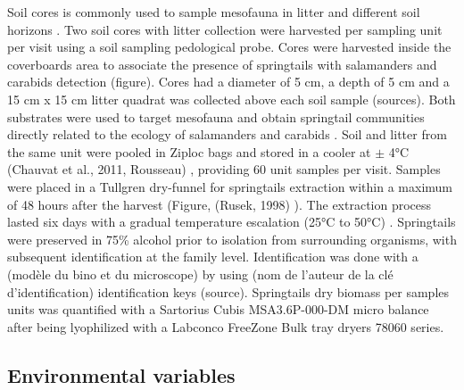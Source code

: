 Soil cores is commonly used to sample mesofauna in litter and different soil horizons \citep{chauvatChangesSoilFaunal2011a,farskaManagementIntensityAffects2014,pongeVerticalDistributionCollembola2000,salamonEffectsPlantDiversity2004,wuCompositionSpatiotemporalVariation2014}. 
Two soil cores with litter collection were harvested per sampling unit per visit using a soil sampling pedological probe. 
Cores were harvested inside the coverboards area to associate the presence of springtails with salamanders and carabids detection (figure). 
Cores had a diameter of 5 cm, a depth of 5 cm and a 15 cm x 15 cm litter quadrat was collected above each soil sample (sources).
Both substrates were used to target mesofauna and obtain springtail communities directly related to the ecology of salamanders and carabids \citep{chauvatChangesSoilFaunal2011a,edwardsAssessmentPopulationsSoilinhabiting1991,raymond-leonardSpringtailCommunityStructure2018a,rousseauForestFloorMesofauna2018}.
Soil and litter from the same unit were pooled in Ziploc bags and stored in a cooler at $\pm$ 4°C (Chauvat et al., 2011, Rousseau) \citep{chauvatChangesSoilFaunal2011a,rousseauForestFloorMesofauna2018}, providing 60 unit samples per visit.
Samples were placed in a Tullgren dry-funnel for springtails extraction within a maximum of 48 hours after the harvest (Figure, (Rusek, 1998) \citealp{rousseauForestFloorMesofauna2018,wuCompositionSpatiotemporalVariation2014}). 
The extraction process lasted six days with a gradual temperature escalation (25°C to 50°C) \citep{raymond-leonardSpringtailCommunityStructure2018a}.
Springtails were preserved in 75\% alcohol \citep{wuCompositionSpatiotemporalVariation2014} prior to isolation from surrounding organisms, with subsequent identification at the family level.
Identification was done with a (modèle du bino et du microscope) by using (nom de l'auteur de la clé d'identification) identification keys (source).
Springtails dry biomass per samples units was quantified with a Sartorius Cubis MSA3.6P-000-DM micro balance after being lyophilized with a Labconco FreeZone Bulk tray dryers 78060 series.



\subsection*{Environmental variables}
\label{subsec:EnvVar}

